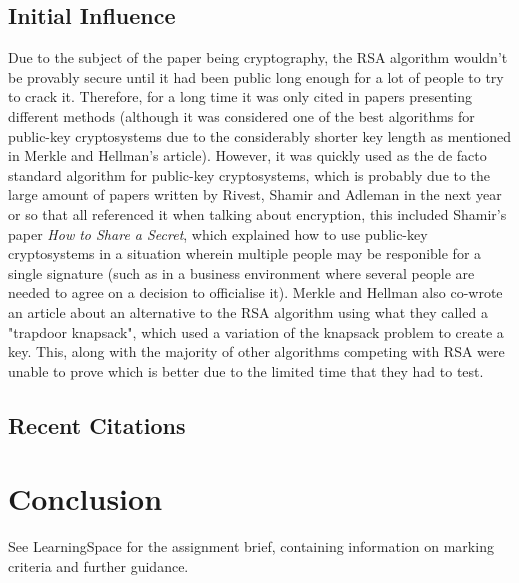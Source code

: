 \documentclass{article}
\begin{document}
\subsection{Initial Influence}
Due to the subject of the paper being cryptography, the RSA algorithm wouldn't be provably secure until it had been public long enough for a lot of people to try to crack it. Therefore, for a long time it was only cited in papers presenting different methods (although it was considered one of the best algorithms for public-key cryptosystems due to the considerably shorter key length as mentioned in Merkle and Hellman's article\cite{merkle1978hiding}). However, it was quickly used as the de facto standard algorithm for public-key cryptosystems, which is probably due to the large amount of papers written by Rivest, Shamir and Adleman in the next year or so that all referenced it when talking about encryption, this included Shamir's paper \textit{How to Share a Secret}\cite{shamir1979share}, which explained how to use public-key cryptosystems in a situation wherein multiple people may be responible for a single signature (such as in a business environment where several people are needed to agree on a decision to officialise it). Merkle and Hellman also co-wrote an article about an alternative to the RSA algorithm using what they called a "trapdoor knapsack"\cite{merkle1978hiding}, which used a variation of the knapsack problem to create a key. This, along with the majority of other algorithms competing with RSA were unable to prove which is better due to the limited time that they had to test.
\subsection{Recent Citations}

\section{Conclusion}

See LearningSpace for the assignment brief, containing information on marking criteria and further guidance.



\end{document}

